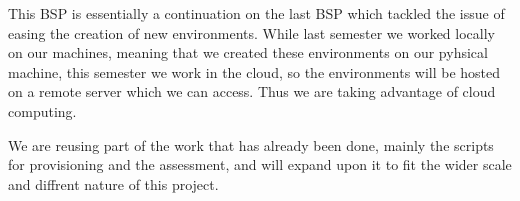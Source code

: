 %
%
%

This BSP is essentially a continuation on the last BSP which tackled
the issue of easing the creation of new environments. While last
semester we worked locally on our machines, meaning that we created
these environments on our pyhsical machine, this semester we work in
the cloud, so the environments will be hosted on a remote server which
we can access. Thus we are taking advantage of cloud computing.

We are reusing part of the work that has already been done, mainly the
scripts for provisioning and the assessment, and will expand upon it
to fit the wider scale and diffrent nature of this project.
